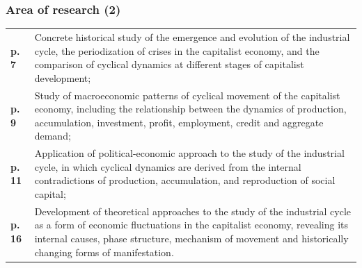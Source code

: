 \begin{frame}
  \frametitle{Area of research (2)}
  \begin{tabularx}{\textwidth}{l>{\raggedright\arraybackslash\hyphenpenalty=10000\exhyphenpenalty=10000}X}
    \textbf{p. 7} & Concrete historical study of the emergence and evolution of the industrial cycle, the periodization of crises in the capitalist economy, and the comparison of cyclical dynamics at different stages of capitalist development; \\
    \textbf{p. 9} & Study of macroeconomic patterns of cyclical movement of the capitalist economy, including the relationship between the dynamics of production, accumulation, investment, profit, employment, credit and aggregate demand; \\
    \textbf{p. 11} & Application of political-economic approach to the study of the industrial cycle, in which cyclical dynamics are derived from the internal contradictions of production, accumulation, and reproduction of social capital; \\
    \textbf{p. 16} & Development of theoretical approaches to the study of the industrial cycle as a form of economic fluctuations in the capitalist economy, revealing its internal causes, phase structure, mechanism of movement and historically changing forms of manifestation.
  \end{tabularx}
\end{frame}